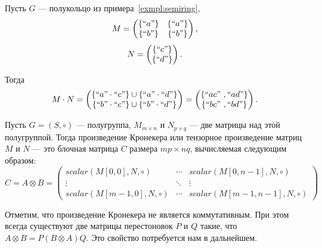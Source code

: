 \begin{example}
Пусть $G$ --- полукольцо из примера~\ref{exmpl:semiring},
$$ M =
\begin{pmatrix}
\{``a"\} & \{``a"\}\\
\{``b"\} & \{``b"\}\\
\end{pmatrix},
$$
$$ N =
\begin{pmatrix}
\{``c"\} \\
\{``d"\} \\
\end{pmatrix}.
$$

Тогда
$$
M \cdot N =
\begin{pmatrix}
\{``a" \cdot ``c"\} \cup \{``a" \cdot ``d"\} \\
\{``b" \cdot ``c"\} \cup \{``b" \cdot ``d"\}
\end{pmatrix}=
\begin{pmatrix}
\{``ac" \ ,  ``ad"\} \\
\{``bc" \ , ``bd"\}
\end{pmatrix}.
$$

\end{example}


\begin{definition}
Пусть $G = (S,\circ)$ --- полугруппа, $M_{m\times n}$ и $N_{p\times q}$ --- две матрицы над этой полугруппой.
Тогда произведение Кронекера или тензорное произведение матриц $M$ и $N$ --- это блочная матрица $C$ размера $mp \times nq$, вычисляемая следующим образом:
$$
C = A \otimes B =
\begin{pmatrix}
scalar(M[0,0],N,\circ)   & \cdots & scalar(M[0,n-1],N,\circ)   \\
\vdots                   & \ddots & \vdots       \\
scalar(M[m-1,0],N,\circ) & \cdots & scalar(M[m-1,n-1],N,\circ)
\end{pmatrix}
$$

\end{definition}

\begin{note}\label{note:KronIsNotCommutative}
Отметим, что произведение Кронекера не является коммутативным.
При этом всегда существуют две матрицы перестоновок $P$ и $Q$ такие, что $A \otimes B = P(B \otimes A)Q$.
Это свойство потребуется нам в дальнейшем.
\end{note}

\newcommand{\examplemtrx}
{
\begin{pmatrix}
5 & 6 & 7 & 8 \\
9 & 10 & 11 & 12 \\
13 & 14 & 15 & 16
\end{pmatrix}
}

